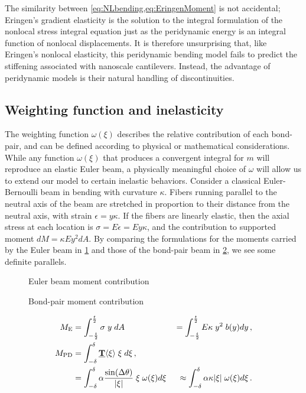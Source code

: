 The similarity between \cref{eq:NLbending,eq:EringenMoment} is not accidental; Eringen's gradient elasticity is the solution to the integral formulation of the nonlocal stress integral equation just as the peridynamic energy is an integral function of nonlocal displacements.
It is therefore unsurprising that, like Eringen's nonlocal elasticity\cite{Challamel2008small}, this peridynamic bending model fails to predict the stiffening associated with nanoscale cantilevers.
Instead, the advantage of peridynamic models is their natural handling of discontinuities.

\subsection{Weighting function and inelasticity}
\label{sec:WeightFunction}
The weighting function \(\omega(\xi)\) describes the relative contribution of each bond-pair, and can be defined according to physical or mathematical considerations. 
While any function $\omega(\xi)$ that produces a convergent integral for $m$ will reproduce an elastic Euler beam, a physically meaningful choice of $\omega$ will allow us to extend our model to certain inelastic behaviors.
Consider a classical Euler-Bernoulli beam in bending with curvature \(\kappa\). 
Fibers running parallel to the neutral axis of the beam are stretched in proportion to their distance from the neutral axis, with strain \(\epsilon = y\kappa\). 
If the fibers are linearly elastic, then the axial stress at each location is \(\sigma = E\epsilon = Ey\kappa\), and the contribution to supported moment \(dM = \kappa E y^2 dA\). 
By comparing the formulations for the moments carried by the Euler beam in \cref{fig:EulerBending} and those of the bond-pair beam in \cref{fig:BPBending}, we see some definite parallels.
%
\begin{figure}[htbp]
\centering
{}
\caption{Euler beam moment contribution}
\label{fig:EulerBending}
\end{figure}
%
%
\begin{figure}[htbp]
  \vspace{5mm}
\centering
{}
\caption{Bond-pair moment contribution}
\label{fig:BPBending}
\end{figure}
%
\begin{subequations}
\label{eq:MomentParellels}
\begin{align}
\label{eq:MomentEuler}
M_\text{E}&=\int_{-\frac{t}{2}}^{\frac{t}{2}} \sigma \; y \; dA &= \int_{-\frac{t}{2}}^{\frac{t}{2}} E \kappa \; y^2 \; b(y) dy\, , \\
%
\label{eq:MomentPD}
M_\text{PD}&=\int_{-\delta}^{\delta} \vstate{T}{}{\xi}\; \xi \; d\xi\,, &\notag \\
&= \int_{-\delta}^{\delta} \alpha \frac{\sin(\Delta\theta)}{|\xi|} \; \xi \; \omega(\xi) d\xi\: &\approx \int_{-\delta}^{\delta} \alpha \kappa |\xi| \; \omega(\xi) d\xi\,.
\end{align}
\end{subequations}
